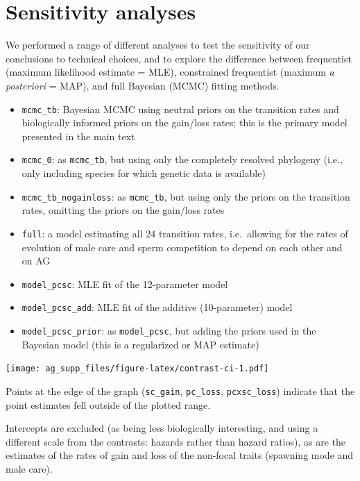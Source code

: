\documentclass[
]{article}
\providecommand{\tightlist}{%
  \setlength{\itemsep}{0pt}\setlength{\parskip}{0pt}}
\begin{document}
\hypertarget{sensitivity-analyses}{%
\section{Sensitivity analyses}\label{sensitivity-analyses}}

We performed a range of different analyses to test the sensitivity of
our conclusions to technical choices, and to explore the difference
between frequentist (maximum likelihood estimate = MLE), constrained
frequentist (maximum \emph{a posteriori} = MAP), and full Bayesian
(MCMC) fitting methods.

\begin{itemize}
\tightlist
\item
  \texttt{mcmc\_tb}: Bayesian MCMC using neutral priors on the
  transition rates and biologically informed priors on the gain/loss
  rates; this is the primary model presented in the main text
\item
  \texttt{mcmc\_0}: as \texttt{mcmc\_tb}, but using only the completely
  resolved phylogeny (i.e., only including species for which genetic
  data is available)
\item
  \texttt{mcmc\_tb\_nogainloss}: as \texttt{mcmc\_tb}, but using only
  the priors on the transition rates, omitting the priors on the
  gain/loss rates
\item
  \texttt{full}: a model estimating all 24 transition rates,
  i.e.~allowing for the rates of evolution of male care and sperm
  competition to depend on each other and on AG
\item
  \texttt{model\_pcsc}: MLE fit of the 12-parameter model
\item
  \texttt{model\_pcsc\_add}: MLE fit of the additive (10-parameter)
  model
\item
  \texttt{model\_pcsc\_prior}: as \texttt{model\_pcsc}, but adding the
  priors used in the Bayesian model (this is a regularized or MAP
  estimate)
\end{itemize}

\texttt{[image: ag\_supp\_files/figure-latex/contrast-ci-1.pdf]}

Points at the edge of the graph (\texttt{sc\_gain}, \texttt{pc\_loss},
\texttt{pcxsc\_loss}) indicate that the point estimates fell outside of
the plotted range.

Intercepts are excluded (as being less biologically interesting, and
using a different scale from the contrasts: hazards rather than hazard
ratios), as are the estimates of the rates of gain and loss of the
non-focal traits (spawning mode and male care).
\end{document}
